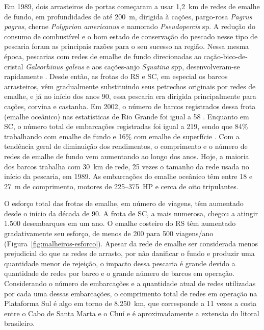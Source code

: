 \documentclass[a4paper,11pt,twoside,showtrims,onecolumn,openright,final]{memoir}
\begin{document}
Em 1989, dois arrasteiros de portas começaram a usar 1,2~km de redes de emalhe de fundo, 
em  profundidades de até 200~m, dirigida à cações, pargo-rosa \emph{Pagrus pagrus}, 
cherne \emph{Polyprion americanus} e namorado \emph{Pseudopercis} sp. A redução do consumo de 
combustível e o bom estado de conservação do pescado nesse tipo de pescaria \citep{BARCELLOS1991} 
foram as principais razões para o seu sucesso na região.
Nessa mesma época, pescarias com redes de emalhe de fundo direcionadas 
ao cação-bico-de-cristal \emph{Galeorhinus galeus} e aos cações-anjo \emph{Squatina} spp, 
desenvolveram-se rapidamente \citep{peres1991b}.
Desde então, as frotas do RS e SC, em especial os barcos arrasteiros, 
vêm gradualmente substituindo seus petrechos 
originais por redes de emalhe, e já no início dos anos 90, 
essa pescaria era dirigida principalmente para cações, corvina e castanha.
Em 2002, o número de barcos registrados dessa frota (emalhe oceânico)
nas estatísticas de Rio Grande foi igual a 58 \citep{ceperg2003}. 
Enquanto em SC, o número total de embarcações registradas foi igual a 219,
sendo que 84\% trabalhando com emalhe de fundo e 16\% com emalhe de superfície \citep{univali2003}.
Com a tendência geral de diminuição dos rendimentos, o comprimento e o número 
de redes de emalhe de fundo vem aumentando ao longo dos anos. 
Hoje, a maioria dos barcos trabalha com 30~km de rede, 
25 vezes o tamanho da rede usada no início da pescaria, em 1989.
As embarcações do emalhe oceânico têm entre 18 e 27~m de comprimento,
motores de 225--375~HP e cerca de oito tripulantes.

O esforço total das frotas de emalhe, em número de viagens, têm aumentado desde o início da década de 90. 
A frota de SC, a mais numerosa, chegou a atingir 1.500 desembarques em um ano. O emalhe costeiro do RS têm
aumentado gradativamente seu esforço, de menos de 200 para 500 viagens/ano (Figura~\ref{fig:malheiros-esforco}).
Apesar da rede de emalhe ser considerada menos prejudicial do que as redes de arrasto,
por não danificar o fundo e produzir uma quantidade menor de rejeição, o impacto dessa pescaria
é grande devido a quantidade de redes por barco e o grande número de barcos em operação. 
Considerando o número de embarcações e a quantidade atual de redes utilizadas
por cada uma dessas embarcações, o comprimento total de redes em operação na Plataforma Sul
é algo em torno de 8.250~km, que corresponde a 11 vezes a costa entre o Cabo
de Santa Marta e o Chuí e é aproximadamente a extensão do litoral brasileiro.

\end{document}
